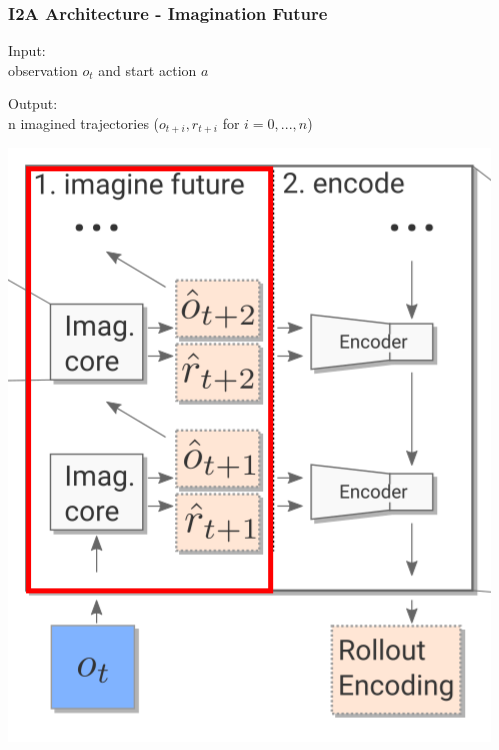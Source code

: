 \begin{frame}
    \frametitle{I2A Architecture - Imagination Future}

\begin{multicols}{2}
	\begin{PraesentationAufzaehlung}
		\item Input:\\
		observation $o_t$ and start action $a$
		\item Output:\\
		n imagined trajectories ($o_{t+i}, r_{t+i}$ for $i = 0, ..., n$)
	\end{PraesentationAufzaehlung}
    \vfill\columnbreak
	\begin{center}
    \includegraphics[height=.5\textheight]{./Images/imagine_future.png}%
	\end{center}
\end{multicols}
    
\end{frame}
\clearpage


